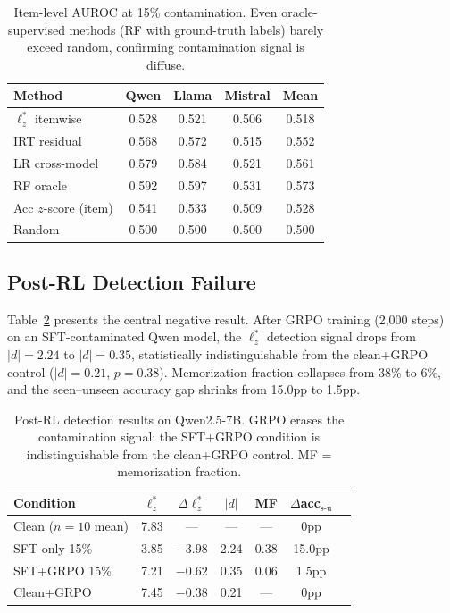 \documentclass[11pt,a4paper]{article}
\begin{document}
\begin{table}[t]
\centering
\caption{Item-level AUROC at 15\% contamination. Even oracle-supervised methods (RF with ground-truth labels) barely exceed random, confirming contamination signal is diffuse.}
\label{tab:baselines-item}
\small
\begin{tabular}{lcccc}
\toprule
\textbf{Method} & \textbf{Qwen} & \textbf{Llama} & \textbf{Mistral} & \textbf{Mean} \\
\midrule
$\ell_z^{*}$ itemwise   & 0.528 & 0.521 & 0.506 & 0.518 \\
IRT residual             & 0.568 & 0.572 & 0.515 & 0.552 \\
LR cross-model           & 0.579 & 0.584 & 0.521 & 0.561 \\
RF oracle                & 0.592 & 0.597 & 0.531 & 0.573 \\
Acc $z$-score (item)     & 0.541 & 0.533 & 0.509 & 0.528 \\
Random                   & 0.500 & 0.500 & 0.500 & 0.500 \\
\bottomrule
\end{tabular}
\end{table}

\subsection{Post-RL Detection Failure}
\label{sec:results-postrl}

Table~\ref{tab:postrl} presents the central negative result.
After GRPO training (2,000 steps) on an SFT-contaminated Qwen model, the $\ell_z^{*}$ detection signal drops from $|d|=2.24$ to $|d|=0.35$, statistically indistinguishable from the clean+GRPO control ($|d|=0.21$, $p=0.38$).
Memorization fraction collapses from 38\% to 6\%, and the seen--unseen accuracy gap shrinks from 15.0pp to 1.5pp.

\begin{table}[t]
\centering
\caption{Post-RL detection results on Qwen2.5-7B. GRPO erases the contamination signal: the SFT+GRPO condition is indistinguishable from the clean+GRPO control. MF = memorization fraction.}
\label{tab:postrl}
\small
\begin{tabular}{lcccccc}
\toprule
\textbf{Condition} & \textbf{$\ell_z^{*}$} & \textbf{$\Delta\ell_z^{*}$} & \textbf{$|d|$} & \textbf{MF} & \textbf{$\Delta$acc$_{\text{s-u}}$} \\
\midrule
Clean ($n{=}10$ mean) & 7.83 & --- & --- & --- & 0pp \\
SFT-only 15\%         & 3.85 & $-3.98$ & 2.24 & 0.38 & 15.0pp \\
SFT+GRPO 15\%         & 7.21 & $-0.62$ & 0.35 & 0.06 & 1.5pp \\
Clean+GRPO            & 7.45 & $-0.38$ & 0.21 & --- & 0pp \\
\bottomrule
\end{tabular}
\end{table}
\end{document}
